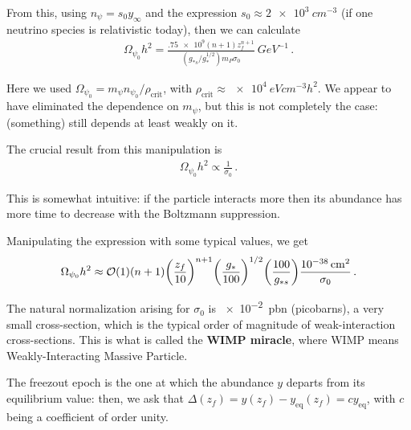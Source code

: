 \documentclass[main.tex]{subfiles}
\begin{document}
From this, using \(n_\psi = s_0 y_\infty \) and the expression \(s_0 \approx \SI{2e3}{cm^{-3}}\) (if one neutrino species is relativistic today), then we can calculate 
%
\begin{align}
\Omega_{\psi_0 } h^2 = \frac{\num{.75e9}(n+1)z_f^{n+1}}{(g_{*s} / g_*^{1/2}) m_P  \sigma_0} \SI{}{GeV^{-1}} 
\,.
\end{align}

Here we used \(\Omega _{\psi_0 } = m_\psi n_{\psi_0 }  / \rho _{\text{crit}}\), with \(\rho _{\text{crit}} \approx \SI{e4}{eV cm^{-3} h^2}\).
We appear to have eliminated the dependence on \(m_\psi \), but this is not completely the case: (something) still depends at least weakly on it. 

The crucial result from this manipulation is 
%
\begin{align}
\Omega_{\psi_0 } h^2 \propto \frac{1}{\sigma_0 }
\,.
\end{align}

This is somewhat intuitive: if the particle interacts more then its abundance has more time to decrease with the Boltzmann suppression. 

Manipulating the expression with some typical values, we get 
%
\begin{align}
\Omega_{\psi_0} h^2 \approx \order{1} (n+1) \qty(\frac{z_f}{10})^{n+1}
\qty(\frac{g_*}{100})^{1/2} \qty(\frac{100}{g_{*s}}) \frac{\SI{e-38}{cm^2}}{\sigma_0 }
\,.
\end{align}

The natural normalization arising for \(\sigma_0\) is \SI{e-2}{pbn} (picobarns), a very small cross-section, which is the typical order of magnitude of weak-interaction cross-sections. 
This is what is called the \textbf{WIMP miracle}, where WIMP means Weakly-Interacting Massive Particle.

The freezout epoch is the one at which the abundance \(y\) departs from its equilibrium value: then, we ask that \(\Delta (z_f) = y(z_f) - y _{\text{eq}} (z_f) = c y _{\text{eq}}\), with \(c\) being a coefficient of order unity.
\end{document}
